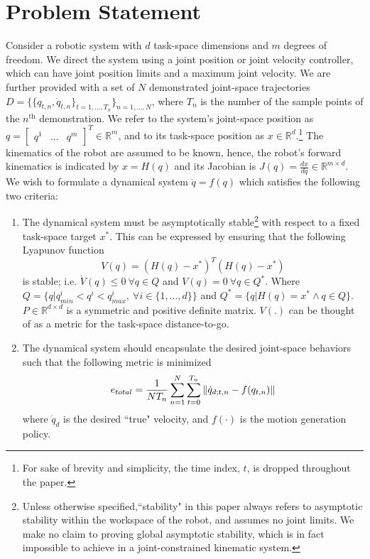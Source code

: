 \documentclass[letterpaper, 10 pt, conference,fleqn]{ieeeconf}
\begin{document}
\section{Problem Statement} \label{Sec:Prob}
Consider a robotic system with $d$ task-space dimensions and $m$ degrees of freedom. We direct the system using a joint position or joint velocity controller, which can have joint position limits and a maximum joint velocity. We are further provided with a set of $N$ demonstrated joint-space trajectories $D=\{\{q_{t,n},\dot{q}_{t,n}\}_{t=1,\dots, T_n}\}_{n=1,\dots,N}$, where $T_n$ is the number of the sample points of the $n^{\text{th}}$ demonstration. We refer to the system's joint-space position as $q=\begin{bmatrix} q^1 & \dots & q^m
\end{bmatrix}^T \in \mathbb{R}^m$, and to its task-space position as $x\in \mathbb{R}^d$.\footnote{For sake of brevity and simplicity, the time index, $t$, is dropped throughout the paper. } The kinematics of the robot are assumed to be known, hence, the robot's forward kinematics is indicated by $x = H(q)$ and its Jacobian is $J(q) = \frac{dx}{dq}\in \mathbb{R}^{m\times d}$.\\
We wish to formulate a dynamical system $\dot{q} = f(q)$ which satisfies the following two criteria:
\renewcommand{\labelenumi}{(\Roman{enumi})}
\begin{enumerate}
\item The dynamical system must be asymptotically stable\footnote{Unless otherwise specified,``stability" in this paper always refers to asymptotic stability within the workspace of the robot, and assumes no joint limits. We make no claim to proving global asymptotic stability, which is in fact impossible to achieve in a joint-constrained kinematic system.} with respect to a fixed task-space target $x^*$. This can be expressed by ensuring that the following Lyapunov function
\begin{equation}
V(q) = (H(q) - x^*)^T(H(q) - x^*) 
\label{eq:Lyp}
\end{equation}
is stable; i.e. $\dot{V}(q)\leq 0 ~\forall q\in Q$ and $V(q)=0~ \forall q\in Q^*$. Where  $Q=\{q|q^i_{min} < q^i < q^i_{max},~\forall i\in \{1,\dots,d\}\}$ and $Q^*=\{q|H(q)=x^*\wedge q\in Q\}$. $P\in \mathbb{R}^{d\times d} $ is a symmetric and positive definite matrix. $V(.)$ can be thought of as a metric for the task-space distance-to-go.
\item The dynamical system should encapsulate the desired joint-space behaviors such that the following metric is minimized
\begin{equation}
\vspace{-5pt}
e_{total} = \frac{1}{NT_n}\sum_{n=1}^N\sum_{t=0}^{T_n} \left \| \dot{q}_{d; t,n} - f(q_{t,n}) \right \|
\label{eq:optim_error}
\end{equation}
  where $\dot{q}_d$ is the desired ``true" velocity, and $f(\cdot)$ is the motion generation policy.
\end{enumerate}
\end{document}
